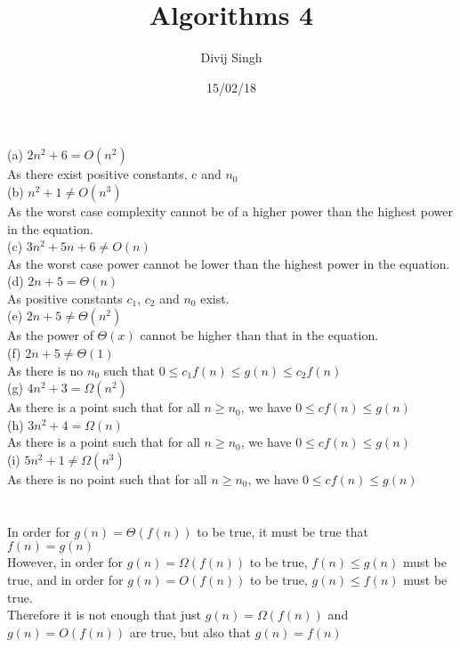 \documentclass{article}
\title{Algorithms 4}
\author{Divij Singh}
\date{15/02/18}
\begin{document}
	\maketitle
	
	\section{}
	
	(a) 
		$2n^2+6=O(n^2)$\\
		As there exist positive constants, c and $n_0$\\
	(b) 
		$n^2 + 1 \neq O(n^3)$\\
		As the worst case complexity cannot be of a higher power than the highest power in the equation.\\
	(c) 
		$3n^2 + 5n +6 \neq O(n)$\\
		As the worst case power cannot be lower than the highest power in the equation.\\
	(d) 
		$2n + 5 =\Theta(n)$\\
		As positive constants $c_1$, $c_2$ and $n_0$ exist.\\
	(e) 
		$2n+5 \neq \Theta(n^2)$\\
		As the power of $\Theta(x)$ cannot be higher than that in the equation.\\
	(f) 
		$2n+5 \neq \Theta(1)$\\
		As there is no $n_0$ such that $0 \leq c_1f(n) \leq g(n) \leq c_2f(n)$\\
	(g) 
		$4n^2 + 3= \Omega(n^2)$\\
		As there is a point such that for all $n \geq n_0$, we have $0 \leq cf(n) \leq g(n)$\\
	(h) 
		$3n^2 +4=\Omega(n)$\\
		As there is a point such that for all $n \geq n_0$, we have $0 \leq cf(n) \leq g(n)$\\
	(i) 
		$5n^2+1 \neq \Omega(n^3)$\\
		As there is no point such that for all $n \geq n_0$, we have $0 \leq cf(n) \leq g(n)$\\
		
	\section{}
	In order for $g(n)=\Theta(f(n))$ to be true, it must be true that $f(n) = g(n)$\\
	However, in order for $g(n)= \Omega(f(n))$ to be true, $f(n)\leq g(n)$ must be true, and in order for $g(n)=O(f(n))$ to be true, $g(n)\leq f(n)$ must be true.\\
	Therefore it is not enough that just $g(n)= \Omega(f(n))$ and $g(n)=O(f(n))$ are true, but also that $g(n)=f(n)$\\
	
\end{document}
